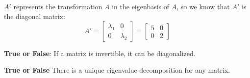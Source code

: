 \begin{enumerate}
{    $A'$ represents the transformation $A$ in the eigenbasis of $A$, so we know that $A'$ is the diagonal matrix:
    $$ A' = 
    \begin{bmatrix}
    \lambda_1 & 0 \\
    0 & \lambda_2
    \end{bmatrix} =
    \begin{bmatrix}
    5 & 0 \\
    0 & 2
    \end{bmatrix} $$
}

\qitem \textbf{True or False}: If a matrix is invertible, it can be diagonalized. \\

\qitem \textbf{True or False} There is a unique eigenvalue decomposition for any matrix. \\






\end{enumerate}